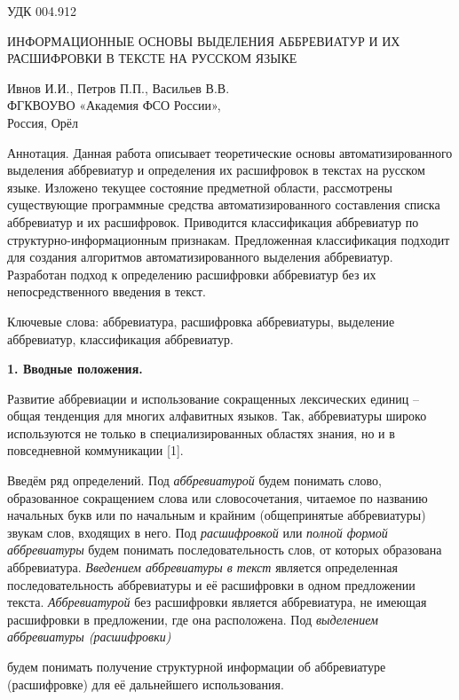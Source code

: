\documentclass[14pt]{extarticle}
\begin{document}
\noindent УДК 004.912
\begin{center}
{\large{ИНФОРМАЦИОННЫЕ ОСНОВЫ ВЫДЕЛЕНИЯ АББРЕВИАТУР И ИХ РАСШИФРОВКИ В ТЕКСТЕ НА РУССКОМ ЯЗЫКЕ}}
\end{center}

\begin{center}
Ивнов И.И., Петров П.П., Васильев В.В. \\
ФГКВОУВО «Академия ФСО России», \\
Россия, Орёл
\end{center}

Аннотация. Данная работа описывает теоретические основы автоматизированного выделения аббревиатур и определения их расшифровок в текстах на русском языке. Изложено текущее состояние предметной области, рассмотрены существующие программные средства автоматизированного составления списка аббревиатур и их расшифровок. Приводится классификация аббревиатур по структурно-информационным признакам. Предложенная классификация подходит для создания алгоритмов автоматизированного выделения аббревиатур. Разработан подход к определению расшифровки аббревиатур без их непосредственного введения в текст.

Ключевые слова: аббревиатура, расшифровка аббревиатуры, выделение аббревиатур, классификация аббревиатур.

\hspace{1cm}

\textbf{1. Вводные положения.}

Развитие аббревиации и использование сокращенных лексических единиц – общая тенденция для многих алфавитных языков. Так, аббревиатуры широко используются не только в специализированных областях знания, но и в повседневной коммуникации [1]. 

Введём ряд определений. Под \textit{аббревиатурой} будем понимать слово, образованное сокращением слова или словосочетания, читаемое по названию начальных букв или по начальным и крайним (общепринятые аббревиатуры) звукам слов, входящих в него. Под \textit{расшифровкой} или \textit{полной формой аббревиатуры} будем понимать последовательность слов, от которых образована аббревиатура. \textit{Введением аббревиатуры в текст} является определенная последовательность аббревиатуры и её расшифровки в одном предложении текста. \textit{Аббревиатурой} без расшифровки является аббревиатура, не имеющая расшифровки в предложении, где она расположена. Под \textit{выделением аббревиатуры (расшифровки)}
\newpage

\noindent будем понимать получение структурной информации об аббревиатуре (расшифровке) для её дальнейшего использования.
\end{document}
